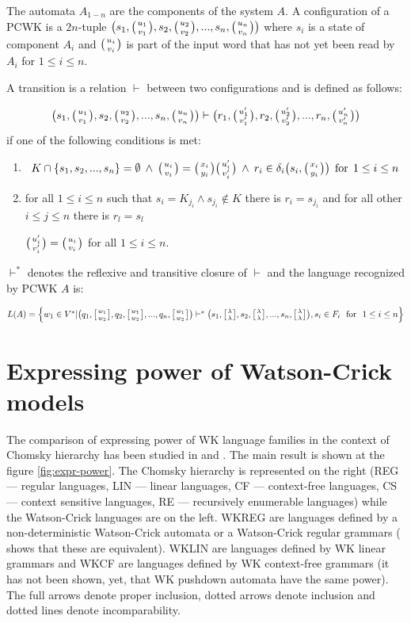The automata $A_{1-n}$ are the components of the system $A$. A configuration  of a PCWK is a $2n$-tuple $\big(s_1, \wkpair{u_1}{v_1}, s_2, \wkpair{u_2}{v_2}, ..., s_n, \wkpair{u_n}{v_n}\big)$
where $s_i$ is a state of component $A_i$ and $\wkpair{u_i}{v_i}$ is part of the input word that has not yet been read by $A_i$ for $1 \leq i \leq n$.

A transition is a relation $\vdash$ between two configurations and is defined as follows:

$$\big(s_1, \wkpair{u_1}{v_1}, s_2, \wkpair{u_2}{v_2}, ..., s_n, \wkpair{u_n}{v_n}\big) \vdash \big(r_1, \wkpair{u'_1}{v'_1}, r_2, \wkpair{u'_2}{v'_2}, ..., r_n, \wkpair{u'_n}{v'_n}\big)$$ if one of the following conditions is met:

\begin{enumerate}
  \item{$$K \cap \{s_1, s_2, ..., s_n\} = \emptyset \: \wedge \: \wkpair{u_i}{v_i} = \wkpair{x_i}{y_i}\wkpair{u'_i}{v'_i} \: \wedge \: r_i \in \delta_i\big(s_i, \wkpair{x_i}{y_i}\big)\:\: \textnormal{for} \:\: 1 \leq i \leq n$$}

  \item{for all $1 \leq i \leq n$ such that $s_i = K_{j_i} \wedge s_{j_i} \notin K$ there is $r_i = s_{j_i}$ and for all other $i \leq j \leq n$ there is $r_l = s_l$

  $\wkpair{u'_i}{v'_i} = \wkpair{u_i}{v_i}$ for all $1 \leq i \leq n$.}
\end{enumerate}

$\vdash^*$ denotes the reflexive and transitive closure of $\vdash$ and the language recognized by PCWK $A$ is:

$L(A) = \Big\{w_1 \in V^*| \big(q_1, \wkdomain{w_1}{w_2}, q_2, \wkdomain{w_1}{w_2}, ..., q_n, \wkdomain{w_1}{w_2}\big) \vdash^* \big(s_1, \wkdomain{\lambda}{\lambda}, s_2, \wkdomain{\lambda}{\lambda}, ..., s_n, \wkdomain{\lambda}{\lambda}\big), s_i \in F_i \:\:\: \textnormal{for} \:\:\: 1 \leq i \leq n\Big\}$

\section{Expressing power of Watson-Crick models} \label{section:exp_power}

The comparison of expressing power of WK language families in the context of Chomsky hierarchy has been studied in \cite{WK_GRAMMARS_1} and \cite{WK_GRAMMARS_2}. The main result is shown at the figure \ref{fig:expr-power}. The Chomsky hierarchy is represented on the right (REG --- regular languages, LIN --- linear languages, CF --- context-free languages, CS --- context sensitive languages, RE --- recursively enumerable languages) while the Watson-Crick languages are on the left. WKREG are languages defined by a non-deterministic Watson-Crick automata or a Watson-Crick regular grammars (\cite{REG_GRAMMAR} shows that these are equivalent). WKLIN are languages defined by WK linear grammars and WKCF are languages defined by WK context-free grammars (it has not been shown, yet, that WK pushdown automata have the same power). The full arrows denote proper inclusion, dotted arrows denote inclusion and dotted lines denote incomparability.

